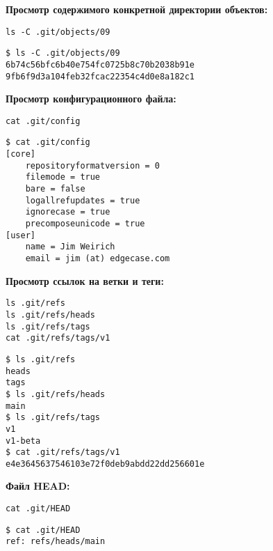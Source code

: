 \documentclass[a4paper,12pt]{report}
\begin{document}

\textbf{Просмотр содержимого конкретной директории объектов:}
\begin{verbatim}
ls -C .git/objects/09
\end{verbatim}
\begin{verbatim}
$ ls -C .git/objects/09
6b74c56bfc6b40e754fc0725b8c70b2038b91e
9fb6f9d3a104feb32fcac22354c4d0e8a182c1
\end{verbatim}


\textbf{Просмотр конфигурационного файла:}
\begin{verbatim}
cat .git/config
\end{verbatim}
\begin{verbatim}
$ cat .git/config
[core]
	repositoryformatversion = 0
	filemode = true
	bare = false
	logallrefupdates = true
	ignorecase = true
	precomposeunicode = true
[user]
	name = Jim Weirich
	email = jim (at) edgecase.com
\end{verbatim}


\textbf{Просмотр ссылок на ветки и теги:}
\begin{verbatim}
ls .git/refs
ls .git/refs/heads
ls .git/refs/tags
cat .git/refs/tags/v1
\end{verbatim}
\begin{verbatim}
$ ls .git/refs
heads
tags
$ ls .git/refs/heads
main
$ ls .git/refs/tags
v1
v1-beta
$ cat .git/refs/tags/v1
e4e3645637546103e72f0deb9abdd22dd256601e
\end{verbatim}


\textbf{Файл HEAD:}
\begin{verbatim}
cat .git/HEAD
\end{verbatim}
\begin{verbatim}
$ cat .git/HEAD
ref: refs/heads/main
\end{verbatim}
\end{document}

